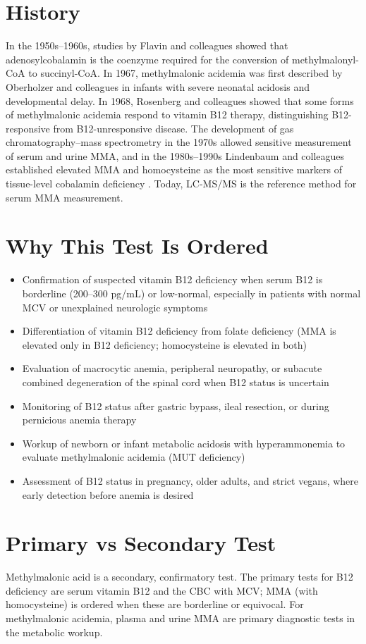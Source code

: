 \section*{History}
In the 1950s--1960s, studies by Flavin and colleagues showed that adenosylcobalamin is the coenzyme required for the conversion of methylmalonyl-CoA to succinyl-CoA. In 1967, methylmalonic acidemia was first described by Oberholzer and colleagues in infants with severe neonatal acidosis and developmental delay. In 1968, Rosenberg and colleagues showed that some forms of methylmalonic acidemia respond to vitamin B12 therapy, distinguishing B12-responsive from B12-unresponsive disease. The development of gas chromatography--mass spectrometry in the 1970s allowed sensitive measurement of serum and urine MMA, and in the 1980s--1990s Lindenbaum and colleagues established elevated MMA and homocysteine as the most sensitive markers of tissue-level cobalamin deficiency \cite{lindenbaum1990diagnosis}. Today, LC-MS/MS is the reference method for serum MMA measurement.
\section*{Why This Test Is Ordered}
\begin{itemize}
  \item Confirmation of suspected vitamin B12 deficiency when serum B12 is borderline (200--300 pg/mL) or low-normal, especially in patients with normal MCV or unexplained neurologic symptoms
  \item Differentiation of vitamin B12 deficiency from folate deficiency (MMA is elevated only in B12 deficiency; homocysteine is elevated in both)
  \item Evaluation of macrocytic anemia, peripheral neuropathy, or subacute combined degeneration of the spinal cord when B12 status is uncertain
  \item Monitoring of B12 status after gastric bypass, ileal resection, or during pernicious anemia therapy
  \item Workup of newborn or infant metabolic acidosis with hyperammonemia to evaluate methylmalonic acidemia (MUT deficiency)
  \item Assessment of B12 status in pregnancy, older adults, and strict vegans, where early detection before anemia is desired
\end{itemize}
\section*{Primary vs Secondary Test}
Methylmalonic acid is a secondary, confirmatory test. The primary tests for B12 deficiency are serum vitamin B12 and the CBC with MCV; MMA (with homocysteine) is ordered when these are borderline or equivocal. For methylmalonic acidemia, plasma and urine MMA are primary diagnostic tests in the metabolic workup.
